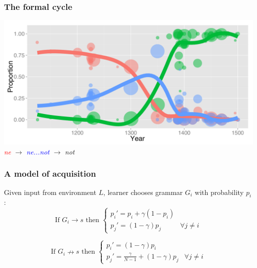 \documentclass[compress]{beamer}
\begin{document}
\begin{frame}
\frametitle{The formal cycle}
	\begin{center}
		\includegraphics[width=.75\textwidth]{neg-docs-lines.pdf}\\
		\emph{\textcolor{red}{ne}} $\rightarrow$ \emph{\textcolor{blue}{ne...not}} $\rightarrow$ \emph{\textcolor{mygreen}{not}}
	\end{center}
\end{frame}



\begin{frame}
\frametitle{A model of acquisition}

Given input from environment $L$, learner chooses grammar $G_i$ with probability $p_i$:
\begin{equation}
 \mbox{If $G_i \rightarrow s$ then }
\left\{
	\begin{array}{ll}
		p_i'  = p_i + \gamma (1-p_i)\\
		p_j'  = (1-\gamma)p_j &  \forall j \neq i
	\end{array}
\right.
\end{equation}

\begin{equation}
 \mbox{If $G_i \nrightarrow s$ then }
\left\{
	\begin{array}{ll}
		p_i'  = (1-\gamma ) p_i \\
		p_j'  = \frac{\gamma}{N - 1} + (1-\gamma)p_j & \forall j \neq i
	\end{array}
\right.
\end{equation}
	\vfill\hfill \parencite{yang2000internal}
\end{frame}
\end{document}
